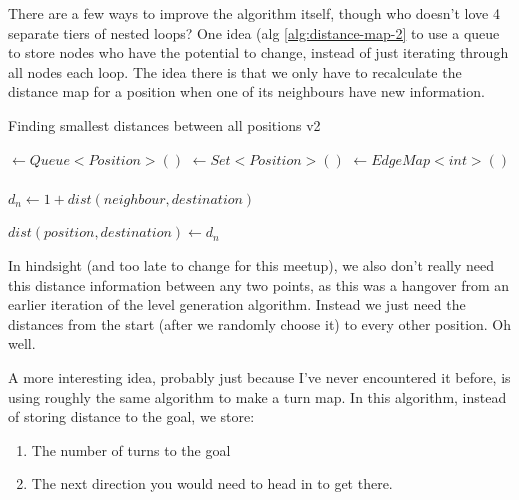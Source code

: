 \documentclass{article}
\begin{document}
There are a few ways to improve the algorithm itself, though who doesn't love 4
separate tiers of nested loops? One idea (alg \ref{alg:distance-map-2} to use a queue to store nodes who have the 
potential to change, instead of just iterating through all nodes each loop. The idea 
there is that we only have to recalculate the distance map for a position when one of its 
neighbours have new information.

\begin{algorithm}
\caption{Finding smallest distances between all positions v2}\label{alg:distance-map-2}
\begin{algorithmic}
 $\gets Queue<Position>()$
 $\gets Set<Position>()$
 $\gets EdgeMap<int>()$
\\

\EndFor
\\

        \State $d_n \gets 1 + dist(neighbour, destination)$

        \State $dist(position, destination) \gets d_n$
        \EndIf
      \EndIf
    \EndFor
  \EndFor
\EndWhile
\end{algorithmic}
\end{algorithm}

In hindsight (and too late to change for this meetup), we also don't really need this 
distance information between any two points, as this was a hangover from an earlier
iteration of the level generation algorithm. Instead we just need the distances from 
the start (after we randomly choose it) to every other position. Oh well. 

A more interesting idea, probably just because I've never encountered it before, 
is using roughly the same algorithm to make a turn map. In this algorithm, 
instead of storing distance to the goal, we store:
\begin{enumerate}
  \item The number of turns to the goal
  \item The next direction you would need to head in to get there.
\end{enumerate}
\end{document}
